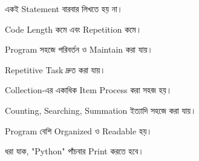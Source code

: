

\begin{compacttwocolpoints}

\item একই Statement বারবার লিখতে হয় না।

\item Code Length কমে এবং Repetition কমে।

\item Program সহজে পরিবর্তন ও Maintain করা যায়।

\item Repetitive Task দ্রুত করা যায়।

\item Collection-এর একাধিক Item Process করা সহজ হয়।

\item Counting, Searching, Summation ইত্যাদি সহজে করা যায়।

\item Program বেশি Organized ও Readable হয়।

\end{compacttwocolpoints}



ধরা যাক,
\textenglish{\ttfamily "Python"}
পাঁচবার Print করতে হবে।

